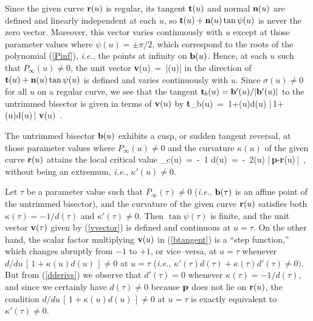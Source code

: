 Since the given curve ${\bf r}(u)$ is regular, its tangent ${\bf t}(u)$
and normal ${\bf n}(u)$ are defined and linearly independent at each $u$,
so ${\bf t}(u)+{\bf n}(u)\tan\psi(u)$ is never the zero vector. Moreover,
this vector varies continuously with $u$ except at those parameter values
where $\psi(u)=\pm\pi/2$, which correspond to the roots of the polynomial
(\ref{Pinf}), {\it i.e.}, the points at infinity on ${\bf b}(u)$. Hence,
at each $u$ such that $P_\infty(u)\not=0$, the unit vector
\be \label{vvector}
{\bf v}(u) \,=\, |\cos\psi(u)\;\!| 
\ee
in the direction of ${\bf t}(u)+{\bf n}(u)\tan\psi(u)$ is defined and
varies continuously with $u$. Since $\sigma(u)\not=0$ for all $u$ on
a regular curve, we see that the tangent ${\bf t}_b(u)={\bf b}'(u) /
|{\bf b}'(u)|$ to the untrimmed bisector is given in terms of ${\bf v}
(u)$ by
\be \label{btangent}
{\bf t}_b(u) \,=\,
{1+\kappa(u)d(u) \over |\,1+\kappa(u)d(u)\,|} \; {\bf v}(u) \,.
\ee

\begin{lma}
The untrimmed bisector ${\bf b}(u)$ exhibits a cusp, or sudden
tangent reversal, at those parameter values where $P_\infty(u)
\not=0$ and the curvature $\kappa(u)$ of the given curve ${\bf r}
(u)$ attains the local critical value
\be \label{kappacrit}
\kappa_c(u) \,=\, -\ {1 \over d(u)} \,=\,
-\ {2\cos\psi(u) \over |\,{\bf p}-{\bf r}(u)\,|} \,,
\ee
without being an extremum, {\it i.e.}, $\kappa'(u)\not=0$.
\end{lma}

\prf Let $\tau$ be a parameter value such that $P_\infty(\tau)\not
=0$ ({\it i.e.}, ${\bf b}(\tau)$ is an affine point of the untrimmed
bisector), and the curvature of the given curve ${\bf r}(u)$ satisfies
both $\kappa(\tau)=-1/d(\tau)$ and $\kappa'(\tau)\not=0$. Then $\tan
\psi(\tau)$ is finite, and the unit vector ${\bf v}(\tau)$ given by
(\ref{vvector}) is defined and continuous at $u=\tau$. On the other
hand, the scalar factor multiplying ${\bf v}(u)$ in (\ref{btangent})
is a ``step function,'' which changes abruptly from $-1$ to $+1$,
or vice--versa, at $u=\tau$ whenever $d/du\,[\,1+\kappa(u)d(u)\,]
\not=0$ at $u=\tau$ ({\it i.e.}, $\kappa'(\tau)d(\tau)+\kappa(\tau)
d'(\tau)\not=0)$. But from (\ref{dderivs}) we observe that $d'(\tau)
=0$ whenever $\kappa(\tau)=-1/d(\tau)$, and since we certainly have
$d(\tau)\not=0$ because ${\bf p}$ does not lie on ${\bf r}(u)$, the
condition $d/du\,[\,1+\kappa(u)d(u)\,]\not=0$ at $u=\tau$ is exactly
equivalent to $\kappa'(\tau)\not=0$. \QED

